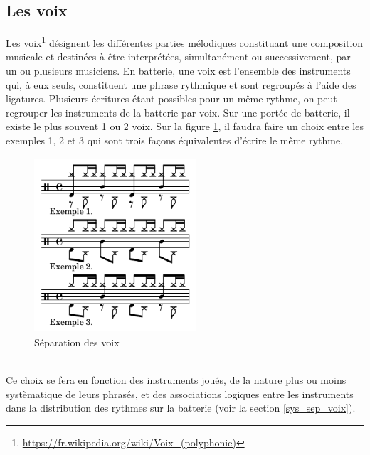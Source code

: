 \subsection*{Les voix}
Les voix\footnote{\url{https://fr.wikipedia.org/wiki/Voix_(polyphonie)}} 
désignent les différentes parties mélodiques constituant une composition musicale et destinées à être interprétées, simultanément ou successivement, par un ou plusieurs musiciens. 
En batterie, une voix est l’ensemble des instruments qui, à eux seuls, constituent une phrase rythmique et sont regroupés à l’aide des ligatures. 
Plusieurs écritures étant possibles pour un même rythme, on peut regrouper les instruments de la batterie par voix. Sur une portée de batterie, il existe le plus souvent 1 ou 2 voix. Sur la figure \ref{sep_voix}, il faudra faire un choix entre les exemples 1, 2 et 3 qui sont trois façons équivalentes d’écrire le même rythme.
\begin{figure}[h]
	\centering
	\includegraphics[height=65mm, width=60mm]{z_images/3_methodes/0_notation_de_la_batterie/7_voix.png}
	\caption{Séparation des voix}
	\label{sep_voix}
\end{figure}\\
Ce choix se fera en fonction des instruments joués, de la nature plus ou moins systèmatique de leurs phrasés, et des associations logiques entre les instruments dans la distribution des rythmes sur la batterie (voir la section \ref{sys_sep_voix}).

